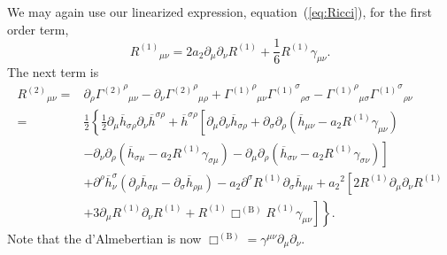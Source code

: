 \documentclass[a4paper, 11pt, titlepage, twoside]{report}
\newcommand{\eqnref}[1]{equation~(\ref{eq:#1})}
\newcommand{\recip}[1]{\ensuremath{\frac{1}{#1}}}
\begin{document}
We may again use our linearized expression, \eqnref{Ricci}, for the first order term,
\begin{equation}
{R^{(1)}}_{\mu\nu} = 2 a_2\partial_\mu\partial_\nu R^{(1)} + \recip{6} R^{(1)}\gamma_{\mu\nu}.
\end{equation}
The next term is
\begin{align}
{R^{(2)}}_{\mu\nu} = {} & \partial_\rho {{\Gamma^{(2)}}^\rho}_{\mu\nu} - \partial_\nu {{\Gamma^{(2)}}^\rho}_{\mu\rho} + {{\Gamma^{(1)}}^\rho}_{\mu\nu}{{\Gamma^{(1)}}^\sigma}_{\rho\sigma} - {{\Gamma^{(1)}}^\rho}_{\mu\sigma}{{\Gamma^{(1)}}^\sigma}_{\rho\nu} \nonumber \\
 = {} & \frac{1}{2}\left\{\recip{2}\partial_\mu\overline{h}_{\sigma\rho}\partial_\nu\overline{h}^{\sigma\rho} + \overline{h}^{\sigma\rho}\left[\partial_\mu\partial_\nu\overline{h}_{\sigma\rho} + \partial_\sigma\partial_\rho\left(\overline{h}_{\mu\nu} - a_2 R^{(1)}\gamma_{\mu\nu}\right) \right.\right. \nonumber \\
 & - \left.\left. \partial_\nu\partial_\rho\left(\overline{h}_{\sigma\mu} - a_2 R^{(1)} \gamma_{\sigma\mu}\right) - \partial_\mu\partial_\rho\left(\overline{h}_{\sigma\nu} - a_2 R^{(1)} \gamma_{\sigma\nu}\right)\right] \right. \nonumber \\
 & + \left. \partial^\rho\overline{h}^\sigma_\nu\left(\partial_\rho\overline{h}_{\sigma\mu} - \partial_\sigma\overline{h}_{\rho\mu}\right) - a_2 \partial^\sigma R^{(1)}\partial_\sigma\overline{h}_{\mu\mu} + {a_2}^2 \left[2R^{(1)}\partial_\mu\partial_\nu R^{(1)} \right.\right. \nonumber \\
 & + \left.\left. 3\partial_\mu R^{(1)}\partial_\nu R^{(1)} + R^{(1)} \Box^{(\mathrm{B})} R^{(1)} \gamma_{\mu\nu}\right]\right\}.
\end{align}
Note that the d'Almebertian is now $\Box^{(\mathrm{B})} = \gamma^{\mu\nu}\partial_\mu\partial_\nu$.
\end{document}

